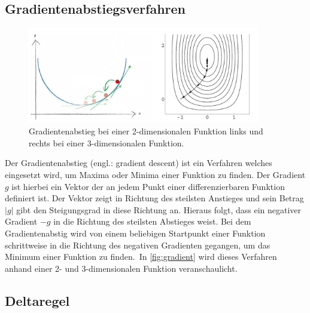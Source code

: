 \subsection{Gradientenabstiegsverfahren}\label{sec:gradient}

\begin{figure}[!htb]
    \centering
        \includegraphics[width=0.9\textwidth]{Bilder/misc/Gradientenabstieg.png}
    \caption[Gradientenabstieg]{Gradientenabstieg bei einer 2-dimensionalen Funktion links und rechts bei einer 3-dimensionalen Funktion.\protect\footnotemark{}}
    \label{fig:gradient}
\end{figure}
\addtocounter{footnote}{-1}     %
\addtocounter{Hfootnote}{-1}    %
\wrapfigfoot{}

Der Gradientenabstieg (engl.: gradient descent) ist ein Verfahren welches eingesetzt wird, um Maxima oder Minima einer Funktion zu finden. Der Gradient $g$ ist hierbei ein Vektor der an jedem Punkt einer differenzierbaren Funktion definiert ist. Der Vektor zeigt in Richtung des steilsten Anstieges und sein Betrag $|g|$ gibt den Steigungsgrad in diese Richtung an. Hieraus folgt, dass ein negativer Gradient $-g$ in die Richtung des steilsten Abstieges weist. Bei dem Gradientenabstig wird von einem beliebigen Startpunkt einer Funktion schrittweise in die Richtung des negativen Gradienten gegangen, um das Minimum einer Funktion zu finden.\, In \autoref{fig:gradient} wird dieses Verfahren anhand einer 2- und 3-dimensionalen Funktion veranschaulicht.


\subsection{Deltaregel}\label{sec:deltaregel}

